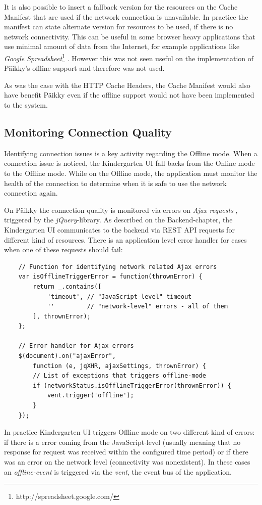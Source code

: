 It is also possible to insert a fallback version for the resources on the Cache Manifest that are used if the network connection is unavailable. In practice the manifest can state alternate version for resources to be used, if there is no network connectivity. This can be useful in some browser heavy applications that use minimal amount of data from the Internet, for example applications like \textit{Google Spreadsheet}\footnote{http://spreadsheet.google.com/} \cite{_using_????}. However this was not seen useful on the implementation of Päikky's offline support and therefore was not used. 

As was the case with the HTTP Cache Headers, the Cache Manifest would also have benefit Päikky even if the offline support would not have been implemented to the system.







\subsection{Monitoring Connection Quality}
\label{subsec:connection-monitoring}
Identifying connection issues is a key activity regarding the Offline mode. When a connection issue is noticed, the Kindergarten UI fall backs from the Online mode to the Offline mode. While on the Offline mode, the application must monitor the health of the connection to determine when it is safe to use the network connection again.

On Päikky the connection quality is monitored via errors on \textit{Ajax requests} \cite{_.ajaxerror_????}, triggered by the \textit{jQuery}-library. As described on the Backend-chapter, the Kindergarten UI communicates to the backend via REST API requests for different kind of resources. There is an application level error handler for cases when one of these requests should fail:
\begin{lstlisting}
    // Function for identifying network related Ajax errors
    var isOfflineTriggerError = function(thrownError) {
        return _.contains([
            'timeout', // "JavaScript-level" timeout
            ''         // "network-level" errors - all of them
        ], thrownError);
    };

    // Error handler for Ajax errors
    $(document).on("ajaxError",
        function (e, jqXHR, ajaxSettings, thrownError) {
        // List of exceptions that triggers offline-mode
        if (networkStatus.isOfflineTriggerError(thrownError)) {
            vent.trigger('offline');
        }
    });
\end{lstlisting}
\noindent
In practice Kindergarten UI triggers Offline mode on two different kind of errors: if there is a error coming from the JavaScript-level (usually meaning that no response for request was received within the configured time period) or if there was an error on the network level (connectivity was nonexistent). In these cases an \textit{offline-event} is triggered via the \textit{vent}, the event bus of the application.

